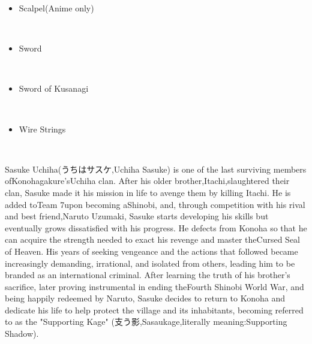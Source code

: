 \documentclass[a4paper,12pt]{article}
\begin{document}
\begin{itemize}
\item Scalpel(Anime only)
\end{itemize}\\ \par \vspace{0.5cm}

\begin{itemize}
\item Sword
\end{itemize}\\ \par \vspace{0.5cm}

\begin{itemize}
\item Sword of Kusanagi
\end{itemize}\\ \par \vspace{0.5cm}

\begin{itemize}
\item Wire Strings
\end{itemize}\\ \par \vspace{0.5cm}

Sasuke Uchiha(うちはサスケ,Uchiha Sasuke) is one of the last surviving members ofKonohagakure'sUchiha clan. After his older brother,Itachi,slaughtered their clan, Sasuke made it his mission in life to avenge them by killing Itachi. He is added toTeam 7upon becoming aShinobi, and, through competition with his rival and best friend,Naruto Uzumaki, Sasuke starts developing his skills but eventually grows dissatisfied with his progress. He defects from Konoha so that he can acquire the strength needed to exact his revenge and master theCursed Seal of Heaven. His years of seeking vengeance and the actions that followed became increasingly demanding, irrational, and isolated from others, leading him to be branded as an international criminal. After learning the truth of his brother's sacrifice, later proving instrumental in ending theFourth Shinobi World War, and being happily redeemed by Naruto, Sasuke decides to return to Konoha and dedicate his life to help protect the village and its inhabitants, becoming referred to as the "Supporting Kage" (支う影,Sasaukage,literally meaning:Supporting Shadow).\\ \par \vspace{0.5cm}
\end{document}
